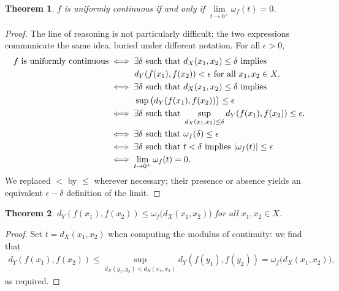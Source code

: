 \documentclass[11pt]{article}
\newtheorem{theorem}{Theorem}
\begin{document}
\begin{theorem}
  $f$ is uniformly continuous if and only if $\lim\limits_{t \to 0^{+}} \omega_{f}(t) = 0$.
\end{theorem}
\begin{adjustwidth}{0.5cm}{}
  \begin{proof}
    The line of reasoning is not particularly difficult; the two expressions communicate the same idea, buried under different notation. For all $\epsilon > 0$,
    \begin{align*}
      \text{$f$ is uniformly continuous} &\iff \exists \delta \text{ such that $d_{X}(x_{1}, x_{2}) \le \delta$ implies} \\
      & \quad \qquad  d_{Y}(f(x_{1}), f(x_{2})) < \epsilon \text{ for all } x_{1}, x_{2} \in X. \\
      &\iff \exists \delta \text{ such that $d_{X}(x_{1}, x_{2}) \le \delta$ implies} \\
      & \quad \qquad  \sup \big( d_{Y}(f(x_{1}), f(x_{2})) \big) \le \epsilon \\
      &\iff \exists \delta \text{ such that } \sup_{d_{X}(x_{1}, x_{2}) \le \delta} d_{Y}(f(x_{1}), f(x_{2})) \le \epsilon. \\
      &\iff \exists \delta \text{ such that } \omega_{f}(\delta) \le \epsilon \\
      &\iff \exists \delta \text{ such that } t < \delta \text{ implies } \abs{\omega_{f}(t)} \le \epsilon \\
      &\iff \lim\limits_{t \to 0^{+}} \omega_{f}(t) = 0.
    \end{align*}
    We replaced $<$ by $\le$ wherever necessary; their presence or absence yields an equivalent $\epsilon - \delta$ definition of the limit.
  \end{proof}
\end{adjustwidth}

\begin{theorem}
  $d_{Y}(f(x_{1}), f(x_{2})) \le \omega_{f} \big( d_{X}(x_{1}, x_{2}) \big)$ for all $x_{1}, x_{2} \in X$.
\end{theorem}
\begin{adjustwidth}{0.5cm}{}
  \begin{proof}
    Set $t = d_{X}(x_{1}, x_{2})$ when computing the modulus of continuity: we find that
    \begin{align*}
      d_{Y}(f(x_{1}), f(x_{2})) \le \sup_{d_{X}(y_{1}, y_{2}) < d_{X}(x_{1}, x_{2})} d_{Y}(f(y_{1}), f(y_{2})) = \omega_{f} \big( d_{X}(x_{1}, x_{2}) \big),
    \end{align*}
    as required.
  \end{proof}
\end{adjustwidth}
\end{document}
